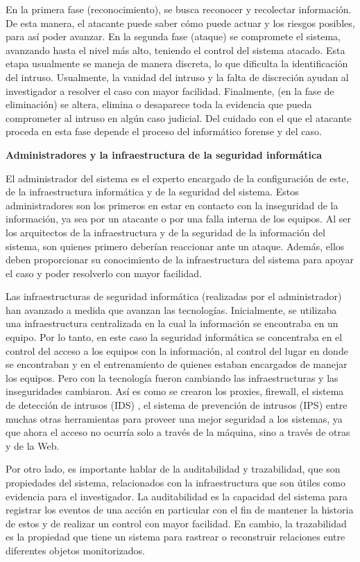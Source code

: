 En la primera fase (reconocimiento), se busca reconocer y recolectar información. De esta manera, el atacante puede saber cómo puede actuar y los riesgos posibles, para así poder avanzar. En la segunda fase (ataque) se compromete el sistema, avanzando hasta el nivel más alto, teniendo el control del sistema atacado. Esta etapa usualmente se maneja de manera discreta, lo que dificulta la identificación del intruso. Usualmente, la vanidad del intruso y la falta de discreción ayudan al investigador a resolver el caso con mayor facilidad. Finalmente, (en la fase de eliminación) se altera, elimina o desaparece toda la evidencia que pueda comprometer al intruso en algún caso judicial. Del cuidado con el que el atacante proceda en esta fase depende el proceso del informático forense y del caso.

\textbf{Administradores y la infraestructura de la seguridad informática}

El administrador del sistema es el experto encargado de la configuración de este, de la infraestructura informática y de la seguridad del sistema. Estos administradores son los primeros en estar en contacto con la inseguridad de la información, ya sea por un atacante o por una falla interna de los equipos. Al ser los arquitectos de la infraestructura y de la seguridad de la información del sistema, son quienes primero deberían reaccionar ante un ataque. Además, ellos deben proporcionar su conocimiento de la infraestructura del sistema para apoyar el caso y poder resolverlo con mayor facilidad.

Las infraestructuras de seguridad informática (realizadas por el administrador) han avanzado a medida que avanzan las tecnologías. Inicialmente, se utilizaba una infraestructura centralizada en la cual la información se encontraba en un equipo. Por lo tanto, en este caso la seguridad informática se concentraba en el control del acceso a los equipos con la información, al control del lugar en donde se encontraban y en el entrenamiento de quienes estaban encargados de manejar los equipos. Pero con la tecnología fueron cambiando las infraestructuras y las inseguridades cambiaron. Así es como se crearon los proxies, firewall, el sistema de detección de intrusos (IDS) , el sistema de prevención de intrusos (IPS) entre muchas otras herramientas para proveer una mejor seguridad a los sistemas, ya que ahora el acceso no ocurría solo a través de la máquina, sino a través de otras y de la Web.

Por otro lado, es importante hablar de la auditabilidad y trazabilidad, que son propiedades del sistema, relacionados con la infraestructura que son útiles como evidencia para el investigador. La auditabilidad es la capacidad del sistema para registrar los eventos de una acción en particular con el fin de mantener la historia de estos y de realizar un control con mayor facilidad. En cambio, la trazabilidad es la propiedad que tiene un sistema para rastrear o reconstruir relaciones entre diferentes objetos monitorizados.

